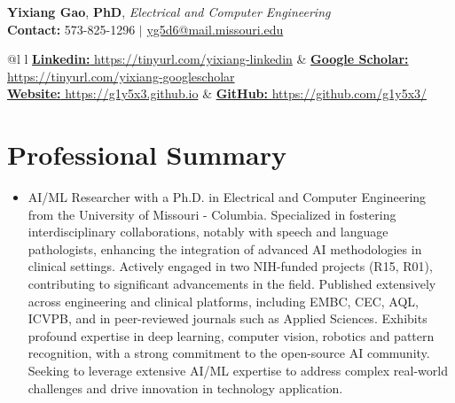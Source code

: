 \documentclass[letterpaper,10pt]{article}
\begin{document}
\begin{flushleft}
  \textbf{\large Yixiang Gao},
  \textbf{\large PhD}, 
  \textit{\large Electrical and Computer Engineering}\\
  \vspace{2.5pt}
  \textbf{Contact:} 573-825-1296 $|$
  \href{mailto:yg5d6@mail.missouri.edu}{yg5d6@mail.missouri.edu}\\
\end{flushleft}

\begin{tabular*}{\textwidth}{@{\extracolsep{\fill}}l l}
  \href{https://www.linkedin.com/in/yixiang-gao-13a1408b/}
  {{\textbf{Linkedin:} https://tinyurl.com/yixiang-linkedin}} & 
  \href{https://scholar.google.com/citations?user=7104qXwAAAAJ&hl=en}
  {{\textbf{Google Scholar:} https://tinyurl.com/yixiang-googlescholar}}\\
  
  \href{https://g1y5x3.github.io}{{\textbf{Website:} https://g1y5x3.github.io}} &
  \href{https://github.com/g1y5x3/}{{\textbf{GitHub:} https://github.com/g1y5x3/}}
\end{tabular*} 

\section{Professional Summary}
\begin{itemize}[leftmargin=0.15in, label={}]
  \item{AI/ML Researcher with a Ph.D. in Electrical and Computer Engineering from the University of 
  Missouri - Columbia. Specialized in fostering interdisciplinary collaborations, notably with 
  speech and language pathologists, enhancing the integration of advanced AI methodologies in 
  clinical settings. Actively engaged in two NIH-funded projects (R15, R01), contributing to 
  significant advancements in the field. Published extensively across engineering and clinical 
  platforms, including EMBC, CEC, AQL, ICVPB, and in peer-reviewed journals such as Applied 
  Sciences. Exhibits profound expertise in deep learning, computer vision, robotics and pattern 
  recognition, with a strong commitment to the open-source AI community. Seeking to leverage 
  extensive AI/ML expertise to address complex real-world challenges and drive innovation in 
  technology application.}
\end{itemize}

\end{document}

